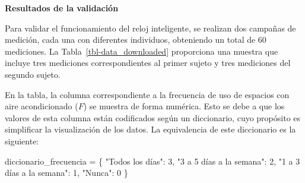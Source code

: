 \documentclass[
  12pt,
  letterpaper,
  DIV=11,
  numbers=noendperiod]{scrreport}
\newenvironment{Shaded}{\begin{snugshade}}{\end{snugshade}}
\newcommand{\DecValTok}[1]{\textcolor[rgb]{0.68,0.00,0.00}{#1}}
\newcommand{\NormalTok}[1]{\textcolor[rgb]{0.00,0.23,0.31}{#1}}
\newcommand{\OperatorTok}[1]{\textcolor[rgb]{0.37,0.37,0.37}{#1}}
\newcommand{\StringTok}[1]{\textcolor[rgb]{0.13,0.47,0.30}{#1}}
\begin{document}
\textbf{Resultados de la validación}

Para validar el funcionamiento del reloj inteligente, se realizan dos
campañas de medición, cada una con diferentes individuos, obteniendo un
total de 60 mediciones. La Tabla~\ref{tbl-data_downloaded} proporciona
una muestra que incluye tres mediciones correspondientes al primer
sujeto y tres mediciones del segundo sujeto.

En la tabla, la columna correspondiente a la frecuencia de uso de
espacios con aire acondicionado (\(F\)) se muestra de forma numérica.
Esto se debe a que los valores de esta columna están codificados según
un diccionario, cuyo propósito es simplificar la visualización de los
datos. La equivalencia de este diccionario es la siguiente:

\begin{Shaded}
\begin{Highlighting}[]
\NormalTok{diccionario\_frecuencia }\OperatorTok{=}\NormalTok{ \{}
    \StringTok{"Todos los días"}\NormalTok{: }\DecValTok{3}\NormalTok{,}
    \StringTok{"3 a 5 días a la semana"}\NormalTok{: }\DecValTok{2}\NormalTok{,}
    \StringTok{"1 a 3 días a la semana"}\NormalTok{: }\DecValTok{1}\NormalTok{,}
    \StringTok{"Nunca"}\NormalTok{: }\DecValTok{0}
\NormalTok{\}}
\end{Highlighting}
\end{Shaded}
\end{document}
